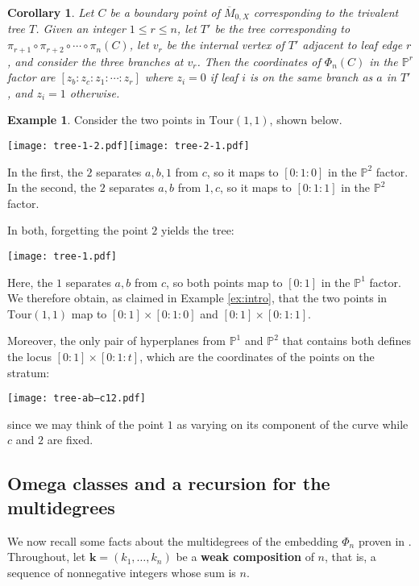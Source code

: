 \documentclass[11pt]{amsart}
\newcommand{\Mbar}{\overline{M}}
\newcommand{\PP}{\mathbb{P}}
\newcommand{\emb}{\Phi}
\newcommand{\Tour}{\mathrm{Tour}}
\newtheorem{corollary}[thm]{Corollary}
\numberwithin{thm}{section}
\numberwithin{equation}{section}
\numberwithin{figure}{section}
\theoremstyle{definition}
\newtheorem{example}[thm]{Example}
\begin{document}
\begin{corollary}\label{cor:full-coordinates}
Let $C$ be a boundary point of $\Mbar_{0,X}$ corresponding to the trivalent tree $T$. Given an integer $1\leq r \leq n$, let $T'$ be the tree corresponding to $\pi_{r+1}\circ\pi_{r+2}\circ\cdots\circ\pi_n(C)$, let $v_r$ be the internal vertex of $T'$ adjacent to leaf edge $r$, and consider the three branches at $v_r$. Then the coordinates of $\emb_n(C)$ in the $\PP^r$ factor are $[z_b:z_c:z_1:\cdots:z_r]$ where $z_i=0$ if leaf $i$ is on the same branch as $a$ in $T'$, and $z_i=1$ otherwise.
\end{corollary}


\begin{example}\label{ex:tour11}
 Consider the two points in $\Tour(1,1)$, shown below.
 \begin{center}
     \texttt{[image: tree-1-2.pdf]}\hspace{2cm}\texttt{[image: tree-2-1.pdf]}
 \end{center}In the first, the $2$ separates $a,b,1$ from $c$, so it maps to $[0:1:0]$ in the $\PP^2$ factor.  In the second, the $2$ separates $a,b$ from $1,c$, so it maps to $[0:1:1]$ in the $\PP^2$ factor.
 
 In both, forgetting the point $2$ yields the tree:
 \begin{center}
 \texttt{[image: tree-1.pdf]}
 \end{center}
 Here, the $1$ separates $a,b$ from $c$, so both points map to $[0:1]$ in the $\PP^1$ factor.  We therefore obtain, as claimed in Example \ref{ex:intro}, that the two points in $\Tour(1,1)$ map to $[0:1]\times [0:1:0]$ and $[0:1]\times [0:1:1]$.
 
 Moreover, the only pair of hyperplanes from $\PP^1$ and $\PP^2$ that contains both defines the locus $[0:1]\times [0:1:t]$, which are the coordinates of the points on the stratum:
 \begin{center}
     \texttt{[image: tree-ab--c12.pdf]}
 \end{center}
 since we may think of the point $1$ as varying on its component of the curve while $c$ and $2$ are fixed.
\end{example}

\subsection{Omega classes and a recursion for the multidegrees}

We now recall some facts about the multidegrees of the embedding $\emb_n$ proven in \cite{CGM}.  Throughout, let $\mathbf{k}=(k_1,\ldots,k_n)$ be a \textbf{weak composition} of $n$, that is, a sequence of nonnegative integers whose sum is $n$. 
\end{document}
